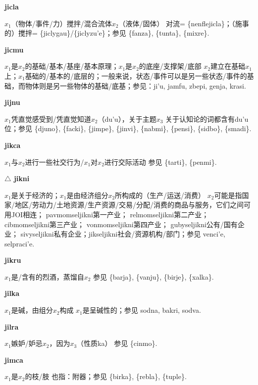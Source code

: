 \documentclass[notitlepage,twocolumn,a4paper,10pt]{book}
\begin{document}
{\sffamily\bfseries jicla} $x_1$（物体\slash{}事件\slash{}力）搅拌\slash{}混合流体$x_2$（液体\slash{}固体） \textemdash{} 对流= \{nenflejicla\}；（施事的）搅拌= \{jiclygau\}\slash{}\{jiclyzu'e\}；参见 \{fanza\}, \{tunta\}, \{mixre\}.

{\sffamily\bfseries jicmu}\enspace {\ttfamily\bfseries[    cmu]}  $x_1$是$x_2$的基础\slash{}基本\slash{}基座\slash{}基本原理；$x_1$是$x_2$的底座\slash{}支撑架\slash{}底部 \textemdash{} $x_2$建立在基础$x_1$上；$x_1$基础的\slash{}基本的\slash{}底层的；一般来说，状态\slash{}事件可以是另一些状态\slash{}事件的基础，而物体则是另一些物体的基础\slash{}底基；参见：{ji'u}, {jamfu}, {zbepi}, {genja}, {krasi}.

{\sffamily\bfseries jijnu}\enspace {\ttfamily\bfseries[jij]}  $x_1$凭直觉感受到\slash{}凭直觉知道$x_2$（du'u），关于主题$x_3$ \textemdash{} 关于认知论的词都含有du'u位；参见 \{djuno\}, \{facki\}, \{jimpe\}, \{jinvi\}, \{nabmi\}, \{pensi\}, \{sidbo\}, \{smadi\}.

{\sffamily\bfseries jikca}\enspace {\ttfamily\bfseries[jik]}  $x_1$与$x_2$进行一些社交行为\slash{}$x_1$对$x_2$进行交际活动 \textemdash{} 参见 \{tarti\}, \{penmi\}.

{\sffamily\bfseries $\triangle$ jikni} $x_1$是关于经济的；$x_1$是由经济组分$x_2$所构成的（生产\slash{}运送\slash{}消费） \textemdash{} $x_2$可能是指国家\slash{}地区\slash{}劳动力\slash{}土地资源\slash{}生产资源\slash{}交易\slash{}分配\slash{}消费的商品与服务，它们之间可用JOI相连； {pavmomseljikni}第一产业； {relmomseljikni}第二产业； {cibmomseljikni}第三产业； {vonmomseljikni}第四产业； {gubyseljikni}公有\slash{}国有企业； {sivyseljikni}私有企业；{jikseljikni}社会\slash{}资源机构\slash{}部门；参见 {venci'e}, {selpraci'e}.

{\sffamily\bfseries jikru} $x_1$是\slash{}含有的烈酒，蒸馏自$x_2$ \textemdash{} 参见 \{barja\}, \{vanju\}, \{birje\}, \{xalka\}.

{\sffamily\bfseries jilka}\enspace {\ttfamily\bfseries[jil]}  $x_1$是碱，由组分$x_2$构成 \textemdash{} $x_1$是呈碱性的；参见 {sodna}, {bakri}, {sodva}.

{\sffamily\bfseries jilra} $x_1$嫉妒\slash{}妒忌$x_2$，因为$x_3$（性质ka） \textemdash{} 参见 \{cinmo\}.

{\sffamily\bfseries jimca}\enspace {\ttfamily\bfseries[jic]}  $x_1$是$x_2$的枝\slash{}肢 \textemdash{} 也指：附器；参见 \{birka\}, \{rebla\}, \{tuple\}.
\end{document}
